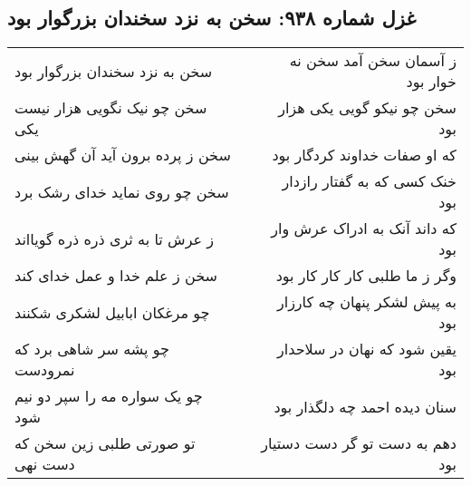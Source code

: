 \begin{center}
\section*{غزل شماره ۹۳۸: سخن به نزد سخندان بزرگوار بود}
\label{sec:0938}
\begin{longtable}{l p{0.5cm} r}
سخن به نزد سخندان بزرگوار بود
&&
ز آسمان سخن آمد سخن نه خوار بود
\\
سخن چو نیک نگویی هزار نیست یکی
&&
سخن چو نیکو گویی یکی هزار بود
\\
سخن ز پرده برون آید آن گهش بینی
&&
که او صفات خداوند کردگار بود
\\
سخن چو روی نماید خدای رشک برد
&&
خنک کسی که به گفتار رازدار بود
\\
ز عرش تا به ثری ذره ذره گویااند
&&
که داند آنک به ادراک عرش وار بود
\\
سخن ز علم خدا و عمل خدای کند
&&
وگر ز ما طلبی کار کار کار بود
\\
چو مرغکان ابابیل لشکری شکنند
&&
به پیش لشکر پنهان چه کارزار بود
\\
چو پشه سر شاهی برد که نمرودست
&&
یقین شود که نهان در سلاحدار بود
\\
چو یک سواره مه را سپر دو نیم شود
&&
سنان دیده احمد چه دلگذار بود
\\
تو صورتی طلبی زین سخن که دست نهی
&&
دهم به دست تو گر دست دستیار بود
\\
\end{longtable}
\end{center}
